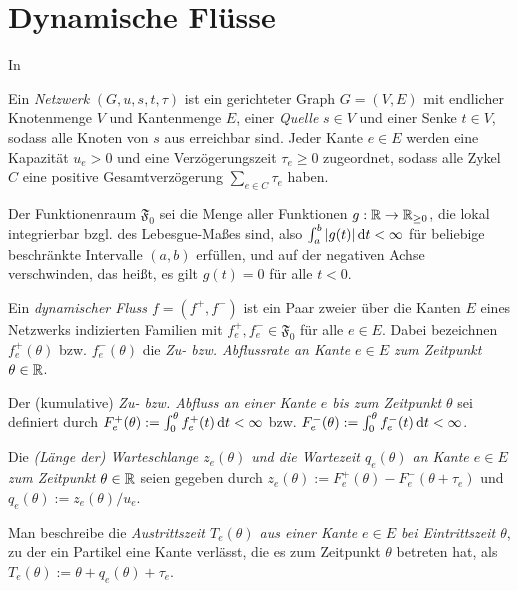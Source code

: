 \section{Dynamische Flüsse}\label{sec-dynamic-flows}

In 

\begin{definition}[Netzwerk]
	Ein \emph{Netzwerk} $(G, u, s, t, \tau)$ ist ein gerichteter Graph $G=(V,E)$ mit endlicher Knotenmenge $V$ und Kantenmenge $E$, einer \emph{Quelle} $s\in V$ und einer Senke $t\in V$, sodass alle Knoten von $s$ aus erreichbar sind.
	Jeder Kante $e\in E$ werden eine Kapazität $u_e > 0$ und eine Verzögerungszeit $\tau_e\geq 0$ zugeordnet, sodass alle Zykel $C$ eine positive Gesamtverzögerung $\sum_{e\in C}\tau_e$ haben.
\end{definition}

\begin{definition}
	Der Funktionenraum $\mathfrak{F}_0$ sei die Menge aller Funktionen $g: \mathbb{R} \to \mathbb{R}_{\geq 0}$, die lokal integrierbar bzgl. des Lebesgue-Maßes sind, also $\int_a^b |g(t)| \mathop{}\!\mathrm{d} t< \infty$ für beliebige beschränkte Intervalle $(a,b)$ erfüllen, und auf der negativen Achse verschwinden, das heißt, es gilt $g(t)=0$ für alle $t<0$.
\end{definition}

\begin{definition}
	Ein \emph{dynamischer Fluss $f=(f^+, f^-)$} ist ein Paar zweier über die Kanten $E$ eines Netzwerks indizierten Familien mit $f^+_e,f^-_e\in\mathfrak F_0$ für alle $e\in E$.
	Dabei bezeichnen $f_e^+(\theta)$ bzw. $f_e^-(\theta)$ die \emph{Zu- bzw. Abflussrate an Kante $e\in E$ zum Zeitpunkt $\theta\in\mathbb{R}$}.
	
	Der (kumulative) \emph{Zu- bzw. Abfluss an einer Kante $e$ bis zum Zeitpunkt $\theta$} sei definiert durch $F^+_e(\theta):=\int_0^\theta f^+_e(t) \mathop{}\!\mathrm{d} t<\infty$ bzw. $F^-_e(\theta):=\int_0^\theta f^-_e(t) \mathop{}\!\mathrm{d} t<\infty$.
	
	Die \emph{(Länge der) Warteschlange $z_e(\theta)$ und die Wartezeit $q_e(\theta)$ an Kante $e\in E$ zum Zeitpunkt $\theta\in\mathbb{R}$} seien gegeben durch $z_e(\theta):= F_e^+(\theta) - F_e^-(\theta + \tau_e)$ und $q_e(\theta) := z_e(\theta) / u_e$.
	
	Man beschreibe die \emph{Austrittszeit $T_e(\theta)$ aus einer Kante $e\in E$ bei Eintrittszeit $\theta$}, zu der ein Partikel eine Kante verlässt, die es zum Zeitpunkt $\theta$ betreten hat, als $T_e(\theta):=\theta + q_e(\theta) + \tau_e$.
\end{definition}

